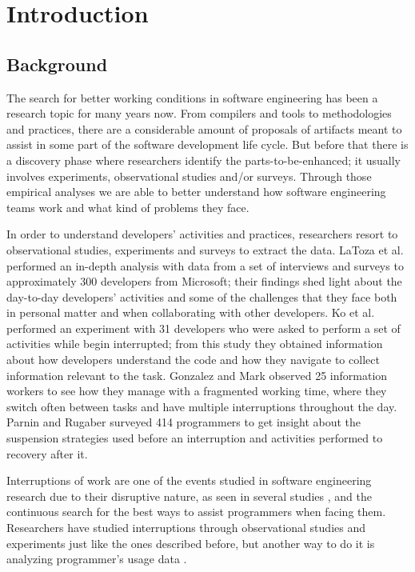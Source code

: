 \chapter{Introduction}

\section{Background}
The search for better working conditions in software engineering has been a research topic for many years now. From compilers and tools to methodologies and practices, there are a considerable amount of proposals of artifacts meant to assist in some part of the software development life cycle. But before that there is a discovery phase where researchers identify the parts-to-be-enhanced; it usually involves experiments, observational studies and/or surveys. Through those empirical analyses we are able to better understand how software engineering teams work and what kind of problems they face.

In order to understand developers' activities and practices, researchers resort to observational studies, experiments and surveys to extract the data. LaToza et al. \cite{LVD06} performed an in-depth analysis with data from a set of interviews and surveys	to approximately 300 developers from Microsoft; their findings shed light about the day-to-day developers' activities and some of the challenges that they face both in personal matter and when collaborating with other developers. Ko et al. \cite{KMC06} performed an experiment with 31 developers who were asked to perform a set of activities while begin interrupted; from this study they obtained information about how developers understand the code and how they navigate to collect information relevant to the task. Gonzalez and Mark \cite{GM04} observed 25 information workers to see how they manage with a fragmented working time, where they switch often between tasks and have multiple interruptions throughout the day. Parnin and Rugaber \cite{PR11} surveyed 414 programmers to get insight about the suspension strategies used before an interruption and activities performed to recovery after it.

Interruptions of work are one of the events studied in software engineering research due to their disruptive nature, as seen in several studies \cite{BKC01, BL96, CDT07, AT04}, and the continuous search for the best ways to assist programmers when facing them. Researchers have studied interruptions through observational studies \cite{IH07, LVD06} and experiments \cite{CDT07} just like the ones described before, but another way to do it is analyzing programmer's usage data \cite{SRV15}.

